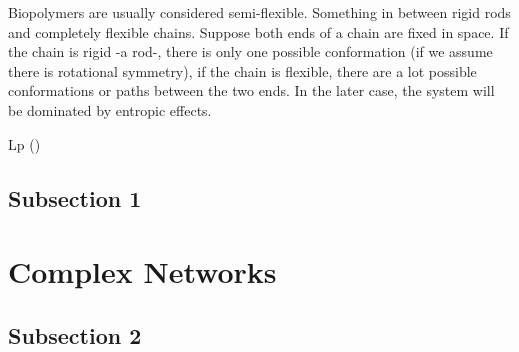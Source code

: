 Biopolymers are usually considered semi-flexible. Something in between rigid
rods and completely flexible chains. Suppose both ends of a chain are fixed in
space. If the chain is rigid -a rod-, there is only one possible conformation
(if we assume there is rotational symmetry), if the chain is flexible, there
are a lot possible conformations or paths between the two ends. In the later
case, the system will be dominated by entropic effects.

\gls{Lp}  
 (\citet{storm_nonlinear_2005})
\citet{stein_algorithm_2008}



\subsection{Subsection 1}






\section{Complex Networks}

\subsection{Subsection 2}